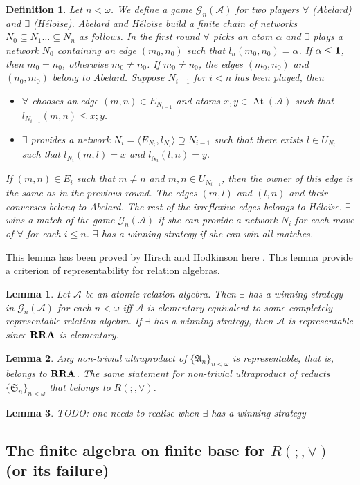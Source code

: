 \documentclass[a4paper]{article}
\theoremstyle{defin}
\newtheorem{defin}{Definition}
\theoremstyle{theorem}
\theoremstyle{prop}
\theoremstyle{lemma}
\newtheorem{lemma}{Lemma}
\theoremstyle{ex}
\theoremstyle{col}
\begin{document}
\begin{defin}
  Let $n < \omega$. We define a game $\mathcal{G}_n(\mathcal{A})$ for two players $\forall$ (Abelard) and $\exists$ (H\'{e}lo\"{i}se). Abelard and H\'{e}lo\"{i}se build a finite chain of networks $N_0 \subseteq N_1 \dots \subseteq N_n$ as follows. In the first round $\forall$ picks an atom $\alpha$ and $\exists$ plays a network $N_0$ containing an edge $(m_0, n_0)$ such that $l_n(m_0, n_0) = \alpha$. If $\alpha \leq {\bf 1}$, then $m_0 = n_0$, otherwise $m_0 \neq n_0$. If $m_0 \neq n_0$, the edges $(m_0, n_0)$ and $(n_0, m_0)$ belong to Abelard. Suppose $N_{i-1}$ for $i < n$ has been played, then
  \begin{itemize}
    \item $\forall$ chooses an edge $(m, n) \in E_{N_{i - 1}}$ and atoms $x, y \in \operatorname{At}(\mathcal{A})$ such that $l_{N_{i - 1}}(m,n) \leq x ; y$.
    \item $\exists$ provides a network $N_i = \langle E_{N_i}, l_{N_i} \rangle \supseteq N_{i - 1}$ such that there exists
    $l \in U_{N_i}$ such that $l_{N_i}(m, l) = x$ and $l_{N_i}(l, n) = y$.
  \end{itemize}
  If $(m,n) \in E_i$ such that $m \neq n$ and $m, n \in U_{N_{i - 1}}$, then the owner of this edge is the same as in the previous round.
  The edges $(m, l)$ and $(l, n)$ and their converses belong to Abelard. The rest of the irreflexive edges belongs to H\'{e}lo\"{i}se. $\exists$ wins a match of the game $\mathcal{G}_n(\mathcal{A})$ if she can provide a network $N_i$ for each move of $\forall$ for each $i \leq n$.
  $\exists$ has a winning strategy if she can win all matches.
\end{defin}

This lemma has been proved by Hirsch and Hodkinson here \cite{hirsch1997step}. This lemma provide a criterion of representability for relation algebras.

\begin{lemma}
  Let $\mathcal{A}$ be an atomic relation algebra. Then $\exists$ has a winning strategy in $\mathcal{G}_n({\mathcal{A}})$ for each $n < \omega$ iff $\mathcal{A}$ is elementary equivalent to some completely representable relation algebra. If $\exists$ has a winning strategy, then $\mathcal{A}$ is representable since ${\bf RRA}$ is elementary.
\end{lemma}

\begin{lemma}
  Any non-trivial ultraproduct of $\{ \mathfrak{A}_n \}_{n < \omega}$ is representable, that is, belongs to ${\bf RRA}$. The same statement for non-trivial ultraproduct of reducts $\{ \mathfrak{S}_n \}_{n < \omega}$ that belongs to $R(;, \vee)$.
\end{lemma}

\begin{lemma}
  TODO: one needs to realise when $\exists$ has a winning strategy
\end{lemma}

\subsection{The finite algebra on finite base for $R(;, \vee)$ (or its failure)}



\end{document}
